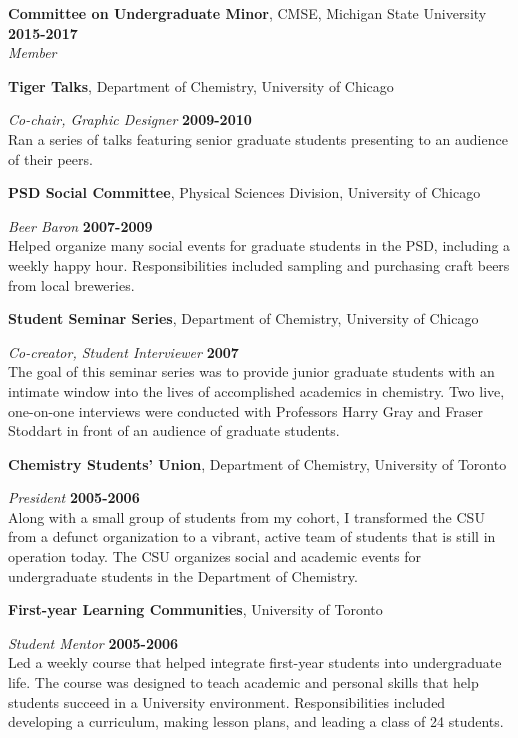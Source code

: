 \documentclass[margin,line]{res}
\begin{document}
\begin{resume}
        {\bf Committee on Undergraduate Minor}, CMSE, Michigan State University \hfill {\bf 2015-2017}\\
        {\emph {Member}}

{\bf Tiger Talks}, Department of Chemistry, University of Chicago

\vspace{-.3cm}
{\em Co-chair, Graphic Designer} \hfill {\bf 2009-2010}\\
Ran a series of talks featuring senior graduate students presenting to an audience of their peers.

{\bf PSD Social Committee}, Physical Sciences Division, University of Chicago

\vspace{-.3cm}
{\em Beer Baron} \hfill {\bf 2007-2009}\\
Helped organize many social events for graduate students in the PSD, including a weekly happy
hour. Responsibilities included sampling and purchasing craft beers from local breweries.

{\bf Student Seminar Series}, Department of Chemistry, University of Chicago

\vspace{-.3cm}
{\em Co-creator, Student Interviewer} \hfill {\bf 2007}\\
The goal of this seminar series was to provide junior graduate students with an intimate window into
the lives of accomplished academics in chemistry. Two live, one-on-one interviews were conducted
with Professors Harry Gray and Fraser Stoddart in front of an audience of graduate students.

{\bf Chemistry Students' Union}, Department of Chemistry, University of Toronto

\vspace{-.3cm}
{\em President} \hfill {\bf 2005-2006}\\
Along with a small group of students from my cohort, I transformed the CSU from a defunct
organization to a vibrant, active team of students that is still in operation today. The CSU organizes
social and academic events for undergraduate
students in the Department of Chemistry.

{\bf First-year Learning Communities}, University of Toronto

\vspace{-.3cm}
{\em Student Mentor} \hfill {\bf 2005-2006}\\
Led a weekly course that helped integrate first-year students into undergraduate life.
The course was designed to teach academic and personal skills that help students succeed in a University environment.
Responsibilities included developing a curriculum, making lesson plans, and leading a class of 24 students.

\end{resume}
\end{document}
